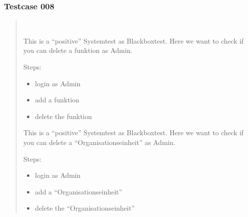 \documentclass[letterpaper,10pt,english]{sphinxmanual}
\begin{document}
\subsubsection{Testcase 008}
\label{\detokenize{masterCodeDoc:testcase-008}}\begin{quote}


\begin{fulllineitems}
~

\begin{fulllineitems}
This is a “positive” Systemtest as Blackboxtest.
Here we want to check if you can delete a funktion as Admin.

Steps:
\begin{itemize}
\item {} 
login as Admin

\item {} 
add a funktion

\item {} 
delete the funktion

\end{itemize}

\end{fulllineitems}



\begin{fulllineitems}
This is a “positive” Systemtest as Blackboxtest.
Here we want to check if you can delete a “Organisationseinheit” as Admin.

Steps:
\begin{itemize}
\item {} 
login as Admin

\item {} 
add a “Organisationseinheit”

\item {} 
delete the “Organisationseinheit”

\end{itemize}

\end{fulllineitems}




\end{fulllineitems}
\end{quote}
\end{document}
